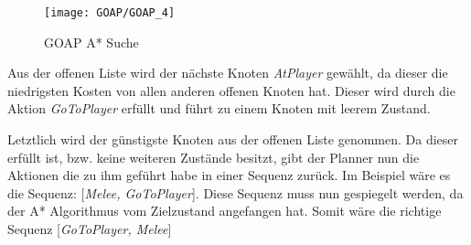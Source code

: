 \begin{figure}[h]
  \centering
  \texttt{[image: GOAP/GOAP\_4]}
	\captionsetup{justification=justified, format=plain}
  \caption{GOAP A* Suche}
  \label{GOAP A* Suche: Erste Aktionen}
\end{figure}

Aus der offenen Liste wird der nächste Knoten \textit{AtPlayer} gewählt, da dieser die niedrigsten Kosten von allen anderen offenen Knoten hat. Dieser wird durch die Aktion \textit{GoToPlayer} erfüllt und führt zu einem Knoten mit leerem Zustand.

Letztlich wird der günstigste Knoten aus der offenen Liste genommen. Da dieser erfüllt ist, bzw. keine weiteren Zustände besitzt, gibt der Planner nun die Aktionen die zu ihm geführt habe in einer Sequenz zurück. Im Beispiel wäre es die Sequenz: [\textit{Melee, GoToPlayer}]. Diese Sequenz muss nun gespiegelt werden, da der A* Algorithmus vom Zielzustand angefangen hat. Somit wäre die richtige Sequenz [\textit{GoToPlayer, Melee}]
\clearpage

%
%
%
